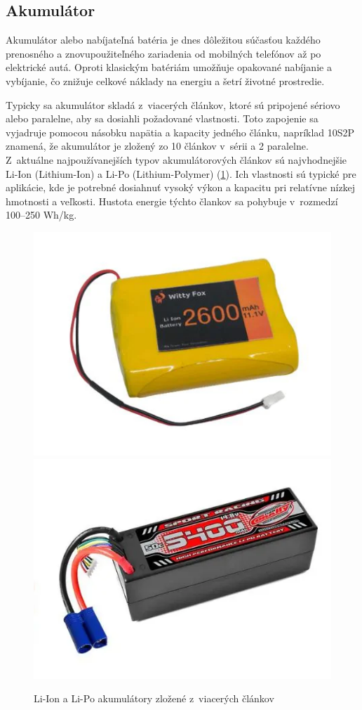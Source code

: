\subsection{Akumulátor}
Akumulátor alebo nabíjateľná batéria je dnes dôležitou súčasťou každého prenosného a znovupoužiteľného zariadenia od mobilných telefónov až po elektrické autá.
Oproti klasickým batériám umožňuje opakované nabíjanie a vybíjanie, čo znižuje celkové náklady na energiu a šetrí životné prostredie.\cite{Larminie}

Typicky sa akumulátor skladá z~viacerých článkov, ktoré sú pripojené sériovo alebo paralelne, aby sa dosiahli požadované vlastnosti.
Toto zapojenie sa vyjadruje pomocou násobku napätia a kapacity jedného článku, napríklad 10S2P znamená, že akumulátor je zložený zo 10 článkov v~sérii a 2 paralelne.
Z~aktuálne najpoužívanejších typov akumulátorových článkov sú najvhodnejšie Li-Ion (Lithium-Ion) a Li-Po (Lithium-Polymer) (\ref{fig:battery}).
Ich vlastnosti sú typické pre aplikácie, kde je potrebné dosiahnuť vysoký výkon a kapacitu pri relatívne nízkej hmotnosti a veľkosti.
Hustota energie týchto člankov sa pohybuje v~rozmedzí 100--250 Wh/kg.\cite{Itani}\cite{Robocraze}

\begin{figure}[h]
    \centering
    \includegraphics[width=0.48\linewidth]{figures/li-ion.png}\hfill
    \includegraphics[width=0.48\linewidth]{figures/li-po.png}
    \caption{Li-Ion a Li-Po akumulátory zložené z~viacerých článkov\cite{Robocraze}}\label{fig:battery}
\end{figure}

